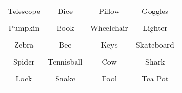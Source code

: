 \documentclass[12pt,a4paper]{article}
\begin{document}
\thispagestyle{empty}
\begin{table}[]
\centering
\Huge
\begin{tabular}{cccc}
 Telescope& Dice& Pillow& Goggles\\  & & & \\
 Pumpkin& Book& Wheelchair& Lighter\\  & & & \\
 Zebra& Bee& Keys& Skateboard\\  & & & \\
 Spider& Tennisball& Cow& Shark\\  & & & \\
 Lock& Snake& Pool& Tea Pot\\  & & & \\
\end{tabular}
\end{table}
\end{document}
